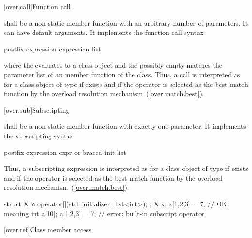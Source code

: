 [over.call]{Function call}%
%

\pnum
{}
shall be a non-static member function with an arbitrary number of
parameters.
It can have default arguments.
It implements the function call syntax

\begin{ncsimplebnf}
postfix-expression \terminal{(} expression-list\opt{} \terminal{)}
\end{ncsimplebnf}

where the
evaluates to a class object and the possibly empty
matches the parameter list of an
member function of the class.
Thus, a call
is interpreted as
for a class object
of type
if
exists and if the operator is selected as the best match function by
the overload resolution mechanism~(\ref{over.match.best}).

[over.sub]{Subscripting}%
%

\pnum
{}
shall be a non-static member function with exactly one parameter.
It implements the subscripting syntax

\begin{ncsimplebnf}
postfix-expression \terminal{[} expr-or-braced-init-list \terminal{]}
\end{ncsimplebnf}

Thus, a subscripting expression
is interpreted as
for a class object
of type
if
exists and if the operator is selected as the best match function by
the overload resolution mechanism~(\ref{over.match.best}).
\begin{example}
\begin{codeblock}
struct X {
  Z operator[](std::initializer_list<int>);
};
X x;
x[{1,2,3}] = 7;           // OK: meaning 
int a[10];
a[{1,2,3}] = 7;           // error: built-in subscript operator
\end{codeblock}
\end{example}

[over.ref]{Class member access}
%

